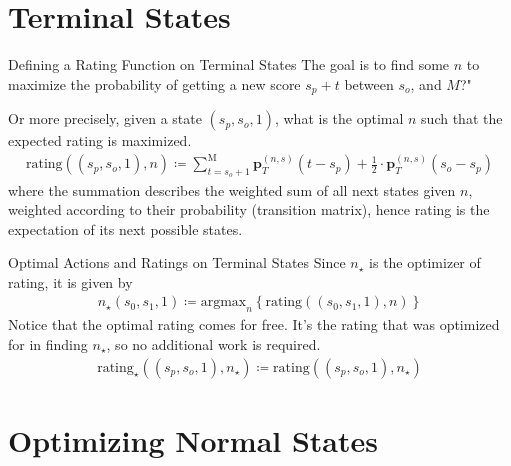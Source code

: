 \documentclass{beamer}
\begin{document}
\section{Terminal States}

\begin{frame}{Defining a Rating Function on Terminal States}
    The goal is to find some $n$ to maximize the probability of getting a new score $s_p + t$ between $s_o$, and $M$?" 
    
    Or more precisely, given a state $(s_p, s_o, 1)$, what is the optimal $n$ such that the expected rating is maximized.  
    \begin{align*}
        \text{rating}((s_p, s_o, 1), n) \coloneqq \sum_{t = s_o+1}^{\text{M}} \textbf{p}_{T}^{(n, s)}(t - s_p) + \frac{1}{2} \cdot \textbf{p}_{T}^{(n, s)}(s_o - s_p)
    \end{align*}
    where the summation describes the weighted sum of all next states given $n$, weighted according to their probability (transition matrix), hence rating is the expectation of its next possible states. 
\end{frame}

\begin{frame}{Optimal Actions and Ratings on Terminal States}
    Since $n_{\star}$ is the optimizer of rating, it is given by
    \begin{align*}
        n_{\star}(s_0, s_1, 1) \coloneqq \text{argmax}_n \left\{ \text{rating}((s_0, s_1, 1), n) \right\}
    \end{align*}
    Notice that the optimal rating comes for free. It's the rating that was optimized for in finding $n_{\star}$, so no additional work is required.
    \begin{align*}
        \text{rating}_{\star}((s_p, s_o, 1), n_{\star}) \coloneqq \text{rating}((s_p, s_o, 1), n_{\star})
    \end{align*}
\end{frame}

\section{Optimizing Normal States}
\end{document}
